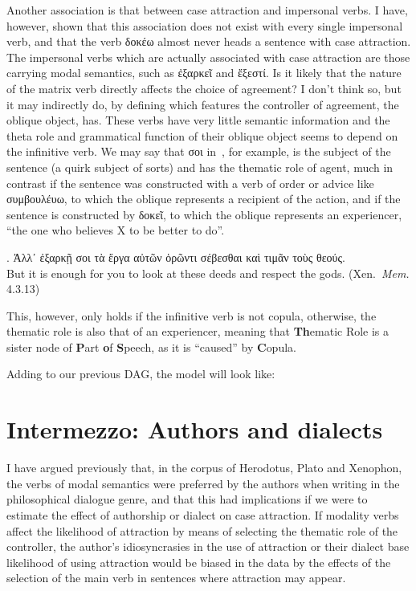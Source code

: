 \documentclass[a4paper, 12pt, article]{memoir}
\begin{document}
Another association is that between case attraction and impersonal verbs.
I have, however, shown that this association does not exist with every single
impersonal verb, and that the verb δοκέω almost never heads a sentence with case
attraction.
The impersonal verbs which are actually associated with case attraction are
those carrying modal semantics, such as ἐξαρκεῖ and ἔξεστί.
Is it likely that the nature of the matrix verb directly affects the choice of
agreement? I don't think so, but it may indirectly do, by defining which
features the controller of agreement, the oblique object, has.
These verbs have very little semantic information and the theta role and
grammatical function of their oblique object seems to depend on the infinitive
verb.
We may say that σοι in~\Next, for example, is the subject of the sentence
(a quirk subject of sorts) and has the thematic role of agent, much in contrast
if the sentence was constructed with a verb of order or advice like συμβουλέυω,
to which the oblique represents a recipient of the action, and if the sentence
is constructed by δοκεῖ, to which the oblique represents an experiencer, ``the
one who believes X to be better to do''.

\ex. Ἀλλ᾽ ἐξαρκῇ σοι τὰ ἔργα αὐτῶν ὁρῶντι σέβεσθαι καὶ τιμᾶν τοὺς θεούς.\\
But it is enough for you to look at these deeds and respect the gods.
(Xen.\ \emph{Mem.} 4.3.13)

This, however, only holds if the infinitive verb is not copula, otherwise, the
thematic role is also that of an experiencer, meaning that \textbf{Th}ematic
Role is a sister node of \textbf{P}art \textbf{o}f \textbf{S}peech, as it is
``caused'' by \textbf{C}opula.

Adding to our previous DAG, the model will look like:



\chapter{Intermezzo: Authors and dialects} %

I have argued previously that, in the corpus of Herodotus, Plato and Xenophon,
the verbs of modal semantics were preferred by the authors when writing in the
philosophical dialogue genre, and that this had implications if we were to estimate
the effect of authorship or dialect on case attraction.
If modality verbs affect the likelihood of attraction by means of selecting the
thematic role of the controller, the author's idiosyncrasies
in the use of attraction or their dialect base likelihood of using attraction
would be biased in the data by the effects of the selection of the main verb in
sentences where attraction may appear.
\end{document}
